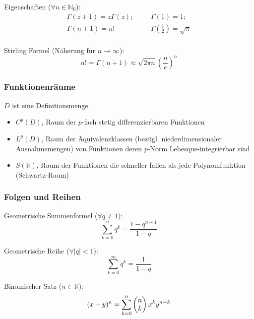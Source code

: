\documentclass[11pt]{article}
\numberwithin{equation}{section}
\begin{document}
				\noindent
				Eigenschaften ($\forall n\in\mathbb{N}_0$):
				\begin{equation}
					\begin{array}{cc}
						\Gamma(z+1)=z\Gamma(z);
						&\hspace{20pt} \Gamma\left(1 \right)=1; \\
						\Gamma(n+1) = n!
						&\hspace{20pt} \Gamma\left(\frac{1}{2} \right)=\sqrt{\pi} \\
					\end{array}
				\end{equation}

				\noindent
				Stirling Formel (Näherung für $n\rightarrow\infty$):
				\begin{equation}
					n! = \Gamma(n+1) \approx \sqrt{2\pi n} \left( \frac{n}{e} \right)^{n}
				\end{equation}


			\subsubsection{Funktionenräume}
				\noindent
				$D$ ist eine Definitionsmenge.
				\begin{itemize}
					\item $C^p(D)$, Raum der $p$-fach stetig differenzierbaren Funktionen
					\item $L^p(D)$, Raum der Äquivalenzklassen (bezügl. niederdimensionaler Ausnahmemengen) von Funktionen deren $p$-Norm Lebesque-integrierbar sind
					\item $S(\mathbb{R})$, Raum der Funktionen die schneller fallen als jede Polynomfunktion (Schwartz-Raum)
				\end{itemize}

			\subsubsection{Folgen und Reihen}
				\noindent
				Geometrische Summenformel ($\forall q \ne 1$):
				\begin{equation}
					\sum_{k=0}^n q^k=\frac{1-q^{n+1}}{1-q}
				\end{equation}

				\noindent
				Geometrische Reihe ($\forall \left|q\right| < 1$):
				\begin{equation}
					\sum_{k=0}^\infty q^k= \frac{1}{1-q}
				\end{equation}

				\noindent
				Binomischer Satz ($n\in\mathbb{R}$):
				\begin{equation}
					(x+y)^n=\sum_{k=0}^{n}\left(\begin{matrix}n\\k\end{matrix}\right)x^k y^{n-k}
				\end{equation}
\end{document}

